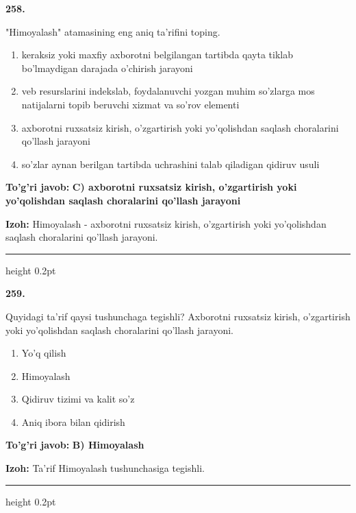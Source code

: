 \documentclass[10pt,a4paper,oneside]{article}
\begin{document}
\noindent\textbf{\color{ink}258.}
\par
"Himoyalash" atamasining eng aniq ta'rifini toping.
\begin{enumerate}[label=\Alph*),leftmargin=9mm]
\item keraksiz yoki maxfiy axborotni belgilangan tartibda qayta tiklab bo'lmaydigan darajada o'chirish jarayoni
\item veb resurslarini indekslab, foydalanuvchi yozgan muhim so'zlarga mos natijalarni topib beruvchi xizmat va so'rov elementi
\item axborotni ruxsatsiz kirish, o'zgartirish yoki yo'qolishdan saqlash choralarini qo'llash jarayoni
\item so'zlar aynan berilgan tartibda uchrashini talab qiladigan qidiruv usuli
\end{enumerate}
\begin{tcolorbox}[enhanced,breakable,colback=teal!4,colframe=teal!50!black,boxrule=0.5pt,arc=1.1mm,left=3mm,right=3mm,top=1.7mm,bottom=1.7mm,before skip=2mm,after skip=2mm]
\textbf{\color{teal}To'g'ri javob:} \textbf{C) axborotni ruxsatsiz kirish, o'zgartirish yoki yo'qolishdan saqlash choralarini qo'llash jarayoni}
\par\smallskip
\textbf{Izoh:} Himoyalash - axborotni ruxsatsiz kirish, o'zgartirish yoki yo'qolishdan saqlash choralarini qo'llash jarayoni.
\end{tcolorbox}
\vspace{2mm}\hrule height 0.2pt \vspace{3mm}

\noindent\textbf{\color{ink}259.}
\par
Quyidagi ta'rif qaysi tushunchaga tegishli? Axborotni ruxsatsiz kirish, o'zgartirish yoki yo'qolishdan saqlash choralarini qo'llash jarayoni.
\begin{enumerate}[label=\Alph*),leftmargin=9mm]
\item Yo'q qilish
\item Himoyalash
\item Qidiruv tizimi va kalit so'z
\item Aniq ibora bilan qidirish
\end{enumerate}
\begin{tcolorbox}[enhanced,breakable,colback=teal!4,colframe=teal!50!black,boxrule=0.5pt,arc=1.1mm,left=3mm,right=3mm,top=1.7mm,bottom=1.7mm,before skip=2mm,after skip=2mm]
\textbf{\color{teal}To'g'ri javob:} \textbf{B) Himoyalash}
\par\smallskip
\textbf{Izoh:} Ta'rif Himoyalash tushunchasiga tegishli.
\end{tcolorbox}
\vspace{2mm}\hrule height 0.2pt \vspace{3mm}
\end{document}
